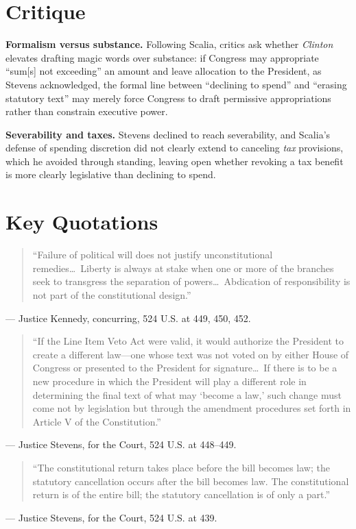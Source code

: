 \documentclass[12pt]{article}
\begin{document}
\section{Critique}

\textbf{Formalism versus substance.} Following Scalia, critics ask whether \textit{Clinton} elevates drafting magic words over substance: if Congress may appropriate ``sum[s] not exceeding'' an amount and leave allocation to the President, as Stevens acknowledged, the formal line between ``declining to spend'' and ``erasing statutory text'' may merely force Congress to draft permissive appropriations rather than constrain executive power.

\textbf{Severability and taxes.} Stevens declined to reach severability, and Scalia's defense of spending discretion did not clearly extend to canceling \textit{tax} provisions, which he avoided through standing, leaving open whether revoking a tax benefit is more clearly legislative than declining to spend.

\section{Key Quotations}

\begin{quote}
``Failure of political will does not justify unconstitutional remedies\ldots\ Liberty is always at stake when one or more of the branches seek to transgress the separation of powers\ldots\ Abdication of responsibility is not part of the constitutional design.''
\end{quote}
\noindent --- Justice Kennedy, concurring, 524 U.S. at 449, 450, 452.

\begin{quote}
``If the Line Item Veto Act were valid, it would authorize the President to create a different law---one whose text was not voted on by either House of Congress or presented to the President for signature\ldots\ If there is to be a new procedure in which the President will play a different role in determining the final text of what may `become a law,' such change must come not by legislation but through the amendment procedures set forth in Article V of the Constitution.''
\end{quote}
\noindent --- Justice Stevens, for the Court, 524 U.S. at 448--449.

\begin{quote}
``The constitutional return takes place before the bill becomes law; the statutory cancellation occurs after the bill becomes law. The constitutional return is of the entire bill; the statutory cancellation is of only a part.''
\end{quote}
\noindent --- Justice Stevens, for the Court, 524 U.S. at 439.
\end{document}
